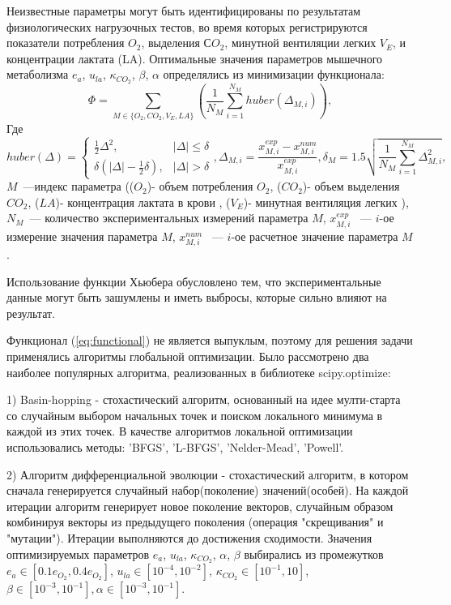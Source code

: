 Неизвестные параметры могут быть идентифицированы по результатам физиологических нагрузочных тестов, во время которых регистрируются показатели потребления \(O_{2}\), выделения \(СO_{2}\), минутной вентиляции легких \(V_{E}\), и концентрации лактата (LA). 
Оптимальные значения параметров мышечного метаболизма $e_{a}$, $u_{la}$, $\kappa_{CO_{2}}$, $\beta$, $\alpha$ определялись из минимизации функционала:
\begin{equation} \label{eq:functional}
\Phi = \sum \limits_{M \in \{O_2, CO_2, V_E, LA\}} \left( \frac{1}{N_M}\sum_{i=1}^{N_M} huber\left(\Delta_{M,i}\right) \right),
\end{equation}
\noindent Где
\begin{equation} \label{eq:huber}
huber(\Delta)=\begin{cases}
\frac{1}{2}\Delta^2,& |\Delta| \le \delta\\
\delta(|\Delta|-\frac{1}{2}\delta),& |\Delta| > \delta
\end{cases}, 
\Delta_{M,i}=\frac{x_{M,i}^{exp}-x_{M,i}^{num}}{x_{M,i}^{exp}}, \delta_M = 1.5\sqrt{\frac{1}{N_M}\sum_{i=1}^{N_M}\Delta_{M, i}^{2}},
\end{equation}
\noindent $M$~---индекс параметра (($O_{2}$)- объем потребления $O_{2}$, ($CO_2$)- объем выделения $CO_{2}$, ($LA$)- концентрация лактата в крови , ($V_E$)- минутная вентиляция легких ), $N_M$~--- количество экспериментальных измерений параметра $M$, $x_{M,i}^{exp}$ ~--- $i$-ое измерение значения параметра $M$, $x_{M,i}^{num}$ ~--- $i$-ое расчетное значение параметра $M$.

Использование функции Хьюбера обусловлено тем, что экспериментальные данные могут быть зашумлены и иметь выбросы, которые сильно влияют на результат. 

Функционал (\ref{eq:functional}) не является выпуклым, поэтому для решения задачи применялись алгоритмы глобальной оптимизации. Было рассмотрено два наиболее популярных алгоритма, реализованных в библиотеке scipy.optimize:

1) Basin-hopping \cite{Wales1997}- стохастический алгоритм, основанный на идее мулти-старта со случайным выбором начальных точек и поиском локального минимума в каждой из этих точек. В качестве алгоритмов локальной оптимизации использовались методы: 'BFGS', 'L-BFGS', 'Nelder-Mead', 'Powell'.    

2) Алгоритм дифференциальной эволюции \cite{Storn1997} - стохастический алгоритм, в котором сначала генерируется случайный набор(поколение) значений(особей). На каждой итерации алгоритм генерирует новое поколение векторов, случайным образом комбинируя векторы из предыдущего поколения (операция "скрещивания" и "мутации"). Итерации выполняются до достижения сходимости. Значения оптимизируемых параметров $e_{a}$, $u_{la}$, $\kappa_{CO_{2}}$, $\alpha$, $\beta$ выбирались из промежутков $e_{a}\in [0.1e_{O_{2}}, 0.4e_{O_{2}}]$, 
$u_{la}\in [10^{-4}, 10^{-2}]$, 
$\kappa_{CO_{2}}\in [10^{-1}, 10]$, 
$\beta \in [10^{-3}, 10^{-1}], \alpha\in [10^{-3}, 10^{-1}]$. 

